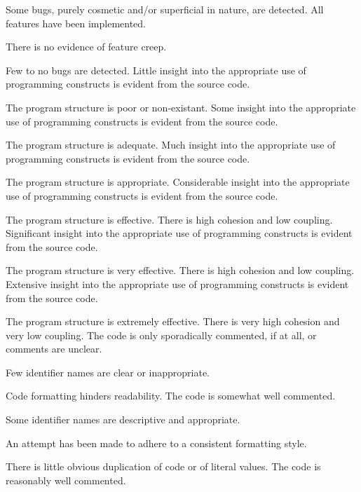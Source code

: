 \documentclass{../fal_assignment}
\begin{document}
\begin{markingrubric}
            \par Some bugs, purely cosmetic and/or superficial in nature, are detected.
        \grade All features have been implemented.
            \par There is no evidence of feature creep.
            \par Few to no bugs are detected.
%
        \grade \fail Little insight into the appropriate use of programming constructs is evident from the source code.
            \par The program structure is poor or non-existant.
        \grade Some insight into the appropriate use of programming constructs is evident from the source code.
            \par The program structure is adequate.
        \grade Much insight into the appropriate use of programming constructs is evident from the source code.
            \par The program structure is appropriate.
        \grade Considerable insight into the appropriate use of programming constructs is evident from the source code.
            \par The program structure is effective. There is high cohesion and low coupling.
        \grade Significant insight into the appropriate use of programming constructs is evident from the source code.
            \par The program structure is very effective. There is high cohesion and low coupling.
        \grade Extensive insight into the appropriate use of programming constructs is evident from the source code.
            \par The program structure is extremely effective. There is very high cohesion and very low coupling.
%
        \grade \fail The code is only sporadically commented, if at all, or comments are unclear.
            \par Few identifier names are clear or inappropriate.
            \par Code formatting hinders readability.
        \grade The code is somewhat well commented.
            \par Some identifier names are descriptive and appropriate.
            \par An attempt has been made to adhere to a consistent formatting style.
             \par There is little obvious duplication of code or of literal values.           
        \grade The code is reasonably well commented.

\end{markingrubric}
\end{document}
